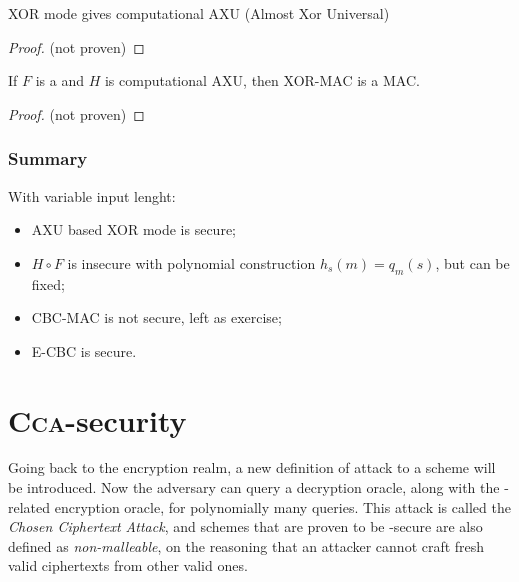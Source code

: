 
\begin{lemma}
    XOR mode gives computational AXU (Almost Xor Universal)
\end{lemma}

\begin{proof}
    (not proven)
\end{proof}

\begin{theorem}
    If $F$ is a \prf{} and $H$ is computational AXU, then XOR-MAC is a MAC.
\end{theorem}

\begin{proof}
    (not proven)
\end{proof}

\subsubsection{Summary}


With variable input lenght:
\begin{itemize}
    \item AXU based XOR mode is secure;
    \item $H \circ F$ is insecure with polynomial construction $h_s(m) = q_m(s)$, but can be fixed;
    \item CBC-MAC is not secure, left as exercise;
    \item E-CBC is secure.
\end{itemize}

\pagebreak

\section{\textsc{Cca}-security}

Going back to the encryption realm, a new definition of attack to a \ske{} scheme will be introduced. Now the adversary can query a decryption oracle, along with the \cpa-related encryption oracle, for polynomially many queries. This attack is called the \emph{Chosen Ciphertext Attack}\footnotemark, and schemes that are proven to be \cca-secure are also defined as \emph{non-malleable}, on the reasoning that an attacker cannot craft fresh valid ciphertexts from other valid ones.

